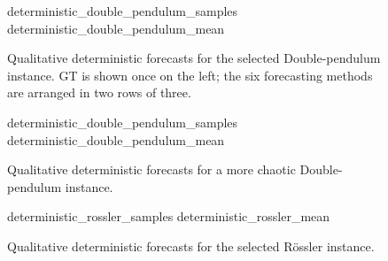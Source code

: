 \newcommand{\stochasticlorenzrow}[1]{%
  \scriptsize Draw~#1
  & \qualpanel{figures/lorenz_stochastic/instance_\StochasticLorenzInstance%
      _stochastic_lorenz_draw_#1_gt}
  & \qualpanel{figures/lorenz_stochastic/instance_\StochasticLorenzInstance%
      _stochastic_lorenz_draw_#1_block_diffusion}
  & \qualpanel{figures/lorenz_stochastic/instance_\StochasticLorenzInstance%
      _stochastic_lorenz_draw_#1_ar_diffusion}
  & \qualpanel{figures/lorenz_stochastic/instance_\StochasticLorenzInstance%
      _stochastic_lorenz_draw_#1_deepar}
  & \qualpanel{figures/lorenz_stochastic/instance_\StochasticLorenzInstance%
      _stochastic_lorenz_draw_#1_streaming_flow}
  & \qualpanel{figures/lorenz_stochastic/instance_\StochasticLorenzInstance%
      _stochastic_lorenz_draw_#1_vsf} \\
}

\begin{figure}[p]
  \centering
    {\DoublePendulumInstance}{deterministic_double_pendulum_samples}
  \vspace{0.5em}
    {\DoublePendulumInstance}{deterministic_double_pendulum_mean}
  \caption{Qualitative deterministic forecasts for the selected
  Double-pendulum instance.  GT is shown once on the left; the six forecasting
  methods are arranged in two rows of three.}
  \label{fig:qualitative-deterministic}
\end{figure}

\begin{figure}[p]
  \centering
    {\DoublePendulumChaoticInstance}{deterministic_double_pendulum_samples}
  \vspace{0.5em}
    {\DoublePendulumChaoticInstance}{deterministic_double_pendulum_mean}
  \caption{Qualitative deterministic forecasts for a more chaotic
  Double-pendulum instance.}
  \label{fig:qualitative-deterministic-double-pendulum-chaotic}
\end{figure}

\begin{figure}[p]
  \centering
    {\DeterministicRosslerInstance}{deterministic_rossler_samples}
  \vspace{0.5em}
    {\DeterministicRosslerInstance}{deterministic_rossler_mean}
  \caption{Qualitative deterministic forecasts for the selected R\"ossler
  instance.}
  \label{fig:qualitative-deterministic-rossler}
\end{figure}


